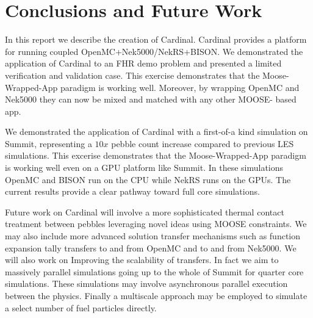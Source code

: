 
\section{Conclusions and Future Work}
\label{s:sum}


In this report we describe the creation of Cardinal. Cardinal provides a platform for running coupled
OpenMC+Nek5000/NekRS+BISON. We demonstrated the application of Cardinal to an FHR demo problem and
presented a limited verification and validation case. This exercise demonstrates that the Moose-Wrapped-App
paradigm is working well. Moreover, by wrapping OpenMC and Nek5000 they can now be mixed and matched
with any other MOOSE- based app.

We demonstrated the application of Cardinal with a first-of-a kind simulation on Summit, representing a $10x$ pebble count increase compared to previous LES simulations. This excerise demonstrates that the Moose-Wrapped-App paradigm is working well even on a GPU platform like Summit. In these simulations OpenMC and BISON run on the CPU while NekRS runs on the GPUs. The current results provide a clear pathway toward full core simulations.

Future work on Cardinal will involve a more sophisticated thermal contact treatment between pebbles
leveraging novel ideas using MOOSE constraints. We may also include more advanced solution transfer
mechanisms such as function expansion tally transfers to and from OpenMC and to and from Nek5000. We
will also work on Improving the scalability of transfers. In fact we aim to massively parallel simulations going up to the whole of Summit
for quarter core simulations. These simulations may involve asynchronous parallel execution between the
physics. Finally a multiscale approach may be employed to simulate a select number of fuel particles directly.
